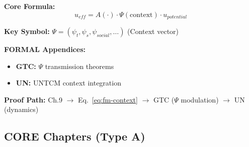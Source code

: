 \begin{tcolorbox}[colback=gray!3!white, colframe=gray!60!black,
    title=\textbf{Chapter 9: Context as Endogenous (WHEN)}]

\textbf{Core Formula:}
\begin{equation}
u_{eff} = A(\cdot) \cdot \Psi(\text{context}) \cdot u_{potential}
\label{eq:fm-context}
\end{equation}

\textbf{Key Symbol:} $\Psi = (\psi_t, \psi_s, \psi_{social}, \ldots)$ (Context vector)

\textbf{FORMAL Appendices:}
\begin{itemize}[nosep]
    \item \textbf{GTC:} $\Psi$ transmission theorems
    \item \textbf{UN:} UNTCM context integration
\end{itemize}

\textbf{Proof Path:} Ch.9 $\rightarrow$ Eq.~\ref{eq:fm-context} $\rightarrow$ GTC ($\Psi$ modulation) $\rightarrow$ UN (dynamics)

\end{tcolorbox}

\subsection{CORE Chapters (Type A)}

